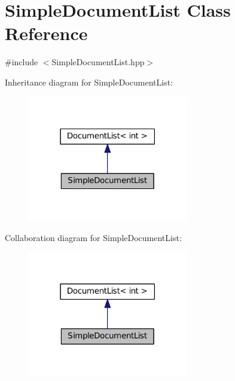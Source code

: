 \hypertarget{class_simple_document_list}{\section{Simple\-Document\-List Class Reference}
\label{class_simple_document_list}
}


{\ttfamily \#include $<$Simple\-Document\-List.\-hpp$>$}



Inheritance diagram for Simple\-Document\-List\-:\nopagebreak
\begin{figure}[H]
\begin{center}
\leavevmode
\includegraphics[width=198pt]{class_simple_document_list__inherit__graph}
\end{center}
\end{figure}


Collaboration diagram for Simple\-Document\-List\-:\nopagebreak
\begin{figure}[H]
\begin{center}
\leavevmode
\includegraphics[width=198pt]{class_simple_document_list__coll__graph}
\end{center}
\end{figure}
